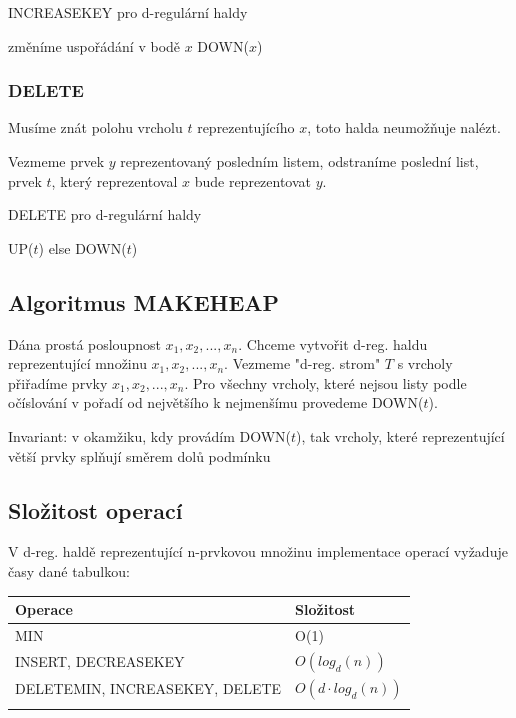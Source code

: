 \begin{algorithm}[!htb]
\caption{INCREASEKEY pro d-regulární haldy}
\label{alg:heap.dreg.incrkey}
\begin{algorithmic}
\STATE změníme uspořádání v bodě $x$ 
\STATE DOWN($x$)
\end{algorithmic}
\end{algorithm}

\subsubsection{DELETE}

Musíme znát polohu vrcholu $t$ reprezentujícího $x$, toto halda neumožňuje
nalézt.
\par
Vezmeme prvek $y$ reprezentovaný posledním listem, odstraníme poslední list,
prvek $t$, který reprezentoval $x$ bude reprezentovat $y$.


\begin{algorithm}[!htb]
\caption{DELETE pro d-regulární haldy}
\label{alg:heap.dreg.delete}
\begin{algorithmic}
  \STATE UP($t$) else DOWN($t$) 
\ENDIF
\end{algorithmic}
\end{algorithm}

\subsection{Algoritmus MAKEHEAP}

Dána prostá posloupnost $x_1, x_2, ..., x_n$.
Chceme vytvořit d-reg. haldu reprezentující množinu 
${ x_1, x_2, ..., x_n }$. Vezmeme "d-reg. strom" $T$ s vrcholy přiřadíme
prvky $x_1, x_2, ..., x_n$. Pro všechny vrcholy, které nejsou listy podle
očíslování v pořadí od největšího k nejmenšímu provedeme DOWN($t$).
\par


Invariant: v okamžiku, kdy provádím DOWN($t$), tak vrcholy, které
reprezentující větší prvky splňují směrem dolů podmínku 

\subsection{Složitost operací}

V d-reg. haldě reprezentující n-prvkovou množinu implementace operací
vyžaduje časy dané tabulkou:

\begin{center}
\begin{tabular}{|l|l|}
\hline
Operace & Složitost \\
\hline
MIN & O(1) \\
INSERT, DECREASEKEY & $O(log_d(n))$ \\
DELETEMIN, INCREASEKEY, DELETE & $O(d \cdot log_d(n))$ \\
\hline
\par
\end{tabular}
\end{center}

